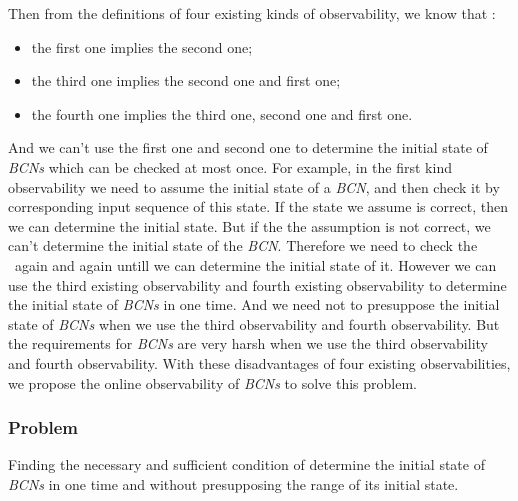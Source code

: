 Then from the definitions of  four existing kinds of observability, we know that \cite{Zhang2016Observability}:
\begin{itemize}
  \item the first one implies the second one;
  \item the third one implies the second one and first one;
  \item the fourth one implies the third one, second one and first one.
\end{itemize} 
 And we can't use the first one and second one to determine the initial state of {\em BCNs} which can be checked at most once. For example, in the first kind observability we need to assume the initial state of a {\em BCN}, and then check it by corresponding input sequence of this state. If the state we assume is correct, then we can determine the initial state. But if the the assumption is not correct, we can't determine the initial state of the {\em BCN}. Therefore we need to check the \BCN\ again and again untill we can determine the initial state of it. However we can use the third existing observability and fourth existing observability to determine the initial state of {\em BCNs} in one time. And we need not to presuppose the initial state of {\em BCNs} when we use the third observability and fourth observability. But the requirements for {\em BCNs} are very harsh when we use the third observability and fourth observability. With these disadvantages of four existing observabilities, we propose the online observability of {\em BCNs} to solve this problem.
 \subsubsection*{Problem}
Finding the necessary and sufficient condition of determine the initial state of {\em BCNs} in one time and without presupposing the range of its initial state.